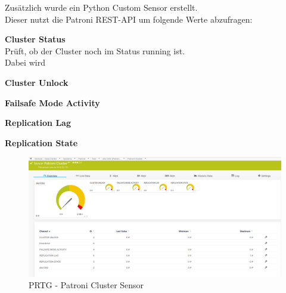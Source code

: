\begin{flushleft}
    Zusätzlich wurde ein Python Custom Sensor erstellt.\\
    Dieser nutzt die Patroni REST-API um folgende Werte abzufragen:
    \begin{description}
        \item \textbf{Cluster Status}\hfill \\Prüft, ob der Cluster noch im Status running ist.\\Dabei wird
        \item \textbf{Cluster Unlock}\hfill \\
        \item \textbf{Failsafe Mode Activity}\hfill \\
        \item \textbf{Replication Lag}\hfill \\
        \item \textbf{Replication State}\hfill \\
    \end{description}


    \begin{figure}[H]
        \centering
        \includegraphics[width=1\linewidth]{source/implementation/construction_implementation/monitoring/patroni_cluster_sensor}
        \caption{\Gls{PRTG} - Patroni Cluster Sensor}
        \label{fig:patroni_cluster_sensor}
    \end{figure}
\end{flushleft}